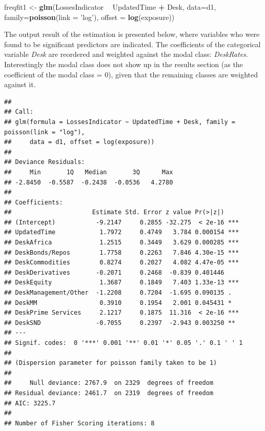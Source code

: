 \documentclass[]{DissertateUSU}
\newenvironment{Shaded}{\begin{snugshade}}{\end{snugshade}}
\newcommand{\KeywordTok}[1]{\textcolor[rgb]{0.13,0.29,0.53}{\textbf{#1}}}
\newcommand{\DataTypeTok}[1]{\textcolor[rgb]{0.13,0.29,0.53}{#1}}
\newcommand{\StringTok}[1]{\textcolor[rgb]{0.31,0.60,0.02}{#1}}
\newcommand{\OperatorTok}[1]{\textcolor[rgb]{0.81,0.36,0.00}{\textbf{#1}}}
\newcommand{\NormalTok}[1]{#1}
\begin{document}
\singlespacing

\begin{Shaded}
\begin{Highlighting}[]
\NormalTok{freqfit1 <-}\StringTok{ }\KeywordTok{glm}\NormalTok{(LossesIndicator }\OperatorTok{~}\StringTok{ }\NormalTok{UpdatedTime }\OperatorTok{+}\StringTok{ }\NormalTok{Desk, }\DataTypeTok{data=}\NormalTok{d1, }
               \DataTypeTok{family=}\KeywordTok{poisson}\NormalTok{(}\DataTypeTok{link =} \StringTok{'log'}\NormalTok{), }\DataTypeTok{offset =} \KeywordTok{log}\NormalTok{(exposure))}
\end{Highlighting}
\end{Shaded}

\doublespacing

The output result of the estimation is presented below, where variables
who were found to be significant predictors are indicated. The
coefficients of the categorical variable \emph{Desk} are reordered and
weighted against the modal class: \emph{DeskRates}. Interestingly the
modal class does not show up in the results section (as the coefficient
of the modal class = \(0\)), given that the remaining classes are
weighted against it.

\singlespacing

\begin{verbatim}
## 
## Call:
## glm(formula = LossesIndicator ~ UpdatedTime + Desk, family = poisson(link = "log"), 
##     data = d1, offset = log(exposure))
## 
## Deviance Residuals: 
##     Min       1Q   Median       3Q      Max  
## -2.8450  -0.5587  -0.2438  -0.0536   4.2780  
## 
## Coefficients:
##                      Estimate Std. Error z value Pr(>|z|)    
## (Intercept)           -9.2147     0.2855 -32.275  < 2e-16 ***
## UpdatedTime            1.7972     0.4749   3.784 0.000154 ***
## DeskAfrica             1.2515     0.3449   3.629 0.000285 ***
## DeskBonds/Repos        1.7758     0.2263   7.846 4.30e-15 ***
## DeskCommodities        0.8274     0.2027   4.082 4.47e-05 ***
## DeskDerivatives       -0.2071     0.2468  -0.839 0.401446    
## DeskEquity             1.3687     0.1849   7.403 1.33e-13 ***
## DeskManagement/Other  -1.2208     0.7204  -1.695 0.090135 .  
## DeskMM                 0.3910     0.1954   2.001 0.045431 *  
## DeskPrime Services     2.1217     0.1875  11.316  < 2e-16 ***
## DeskSND               -0.7055     0.2397  -2.943 0.003250 ** 
## ---
## Signif. codes:  0 '***' 0.001 '**' 0.01 '*' 0.05 '.' 0.1 ' ' 1
## 
## (Dispersion parameter for poisson family taken to be 1)
## 
##     Null deviance: 2767.9  on 2329  degrees of freedom
## Residual deviance: 2461.7  on 2319  degrees of freedom
## AIC: 3225.7
## 
## Number of Fisher Scoring iterations: 8
\end{verbatim}
\end{document}
